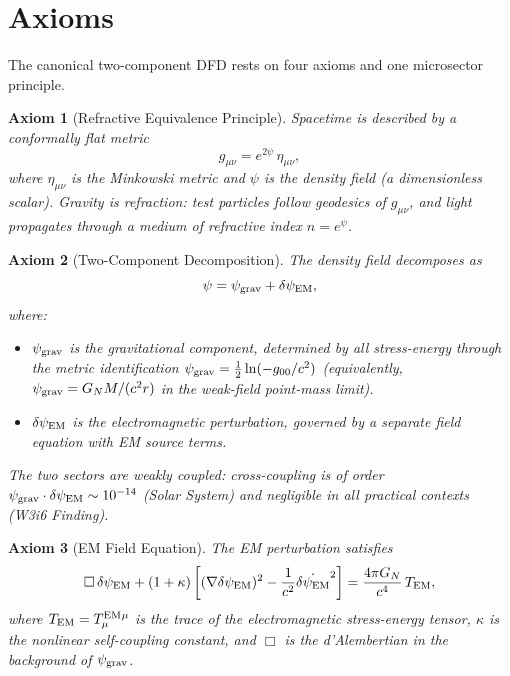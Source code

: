 \documentclass[11pt]{article}
\newtheorem{axiom}{Axiom}
\newcommand{\psigrav}{\psi_{\rm grav}}
\newcommand{\dpsiEM}{\delta\psi_{\rm EM}}
\newcommand{\GN}{G_N}
\begin{document}
\section{Axioms}
\label{sec:axioms}

The canonical two-component DFD rests on four axioms and one microsector
principle.

\begin{axiom}[Refractive Equivalence Principle]
\label{ax:REP}
Spacetime is described by a conformally flat metric
\begin{equation}
g_{\mu\nu} = e^{2\psi}\,\eta_{\mu\nu},
\label{eq:conformal-metric}
\end{equation}
where $\eta_{\mu\nu}$ is the Minkowski metric and $\psi$ is the
\emph{density field} (a dimensionless scalar). Gravity is refraction:
test particles follow geodesics of $g_{\mu\nu}$, and light propagates
through a medium of refractive index $n = e^\psi$.
\end{axiom}

\begin{axiom}[Two-Component Decomposition]
\label{ax:two-comp}
The density field decomposes as
\begin{equation}
\psi = \psigrav + \dpsiEM,
\label{eq:two-comp}
\end{equation}
where:
\begin{itemize}[nosep]
\item $\psigrav$ is the \emph{gravitational} component, determined by
  all stress-energy through the metric identification
  $\psigrav = \frac{1}{2}\ln(-g_{00}/c^2)$ (equivalently,
  $\psigrav = \GN M/(c^2 r)$ in the weak-field point-mass limit).
\item $\dpsiEM$ is the \emph{electromagnetic perturbation}, governed by
  a separate field equation with EM source terms.
\end{itemize}
The two sectors are weakly coupled: cross-coupling is of order
$\psigrav \cdot \dpsiEM \sim 10^{-14}$ (Solar System) and negligible
in all practical contexts (W3i6 Finding).
\end{axiom}

\begin{axiom}[EM Field Equation]
\label{ax:field-eq}
The EM perturbation satisfies
\begin{equation}
\Box\,\dpsiEM + (1+\kappa)\left[(\nabla\dpsiEM)^2
  - \frac{1}{c^2}\dot{\dpsiEM}^2\right]
= \frac{4\pi \GN}{c^4}\,T_{\rm EM},
\label{eq:EM-field-eq}
\end{equation}
where $T_{\rm EM} = T^{\rm EM}_{\mu}{}^{\mu}$ is the trace of the
electromagnetic stress-energy tensor, $\kappa$ is the nonlinear
self-coupling constant, and $\Box$ is the d'Alembertian in the
background of $\psigrav$.
\end{axiom}
\end{document}
